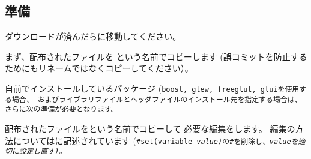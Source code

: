 \subsection{準備}
\label{subsec:PrepareLibrary}

\noindent
ダウンロードが済んだらに移動してください。

\noindent
まず、配布されたファイルを
\CMakeLists{}という名前でコピーします
(誤コミットを防止するためにもリネームではなくコピーしてください）。

\medskip
\begin{narrow}[15pt]
\end{narrow}

\medskip
\noindent
自前でインストールしているパッケージ
(\tt{boost}, \tt{glew}, \tt{freeglut}, \tt{glui}を使用する場合、
およびライブラリファイルとヘッダファイルのインストール先を指定する場合は、
さらに次の準備が必要となります。

配布されたファイルを\CMakeConf{}という名前でコピーして
必要な編集をします。
編集の方法については\CMakeConf{}に記述されています
(\tt{\#set(variable \it{value})}の\tt{\#}を削除し、\it{value}を適切に設定し直す)。

